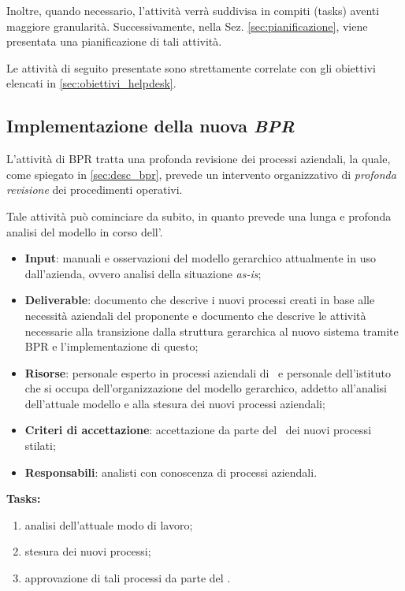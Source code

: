 	Inoltre, quando necessario, l'attività verrà suddivisa in compiti (tasks) aventi maggiore granularità.
	Successivamente, nella Sez. \ref{sec:pianificazione}, viene presentata una pianificazione di tali attività.
	
	Le attività di seguito presentate sono strettamente correlate con gli obiettivi elencati in \ref{sec:obiettivi_helpdesk}.
	
	\subsection{Implementazione della nuova \textit{BPR}}\label{subsec:bpr_implmentation}

		L'attività di BPR tratta una profonda revisione dei processi aziendali, la quale, come spiegato in \ref{sec:desc_bpr}, prevede un intervento organizzativo di \textit{profonda revisione} dei procedimenti operativi.
		
		Tale attività può cominciare da subito, in quanto prevede una lunga e profonda analisi del modello in corso dell'\istituto.
		
		\begin{itemize}[noitemsep]
			\renewcommand\labelitemi{--}
			\item \textbf{Input}: manuali e osservazioni del modello gerarchico attualmente in uso dall'azienda, ovvero analisi della situazione \textit{as-is};
			\item \textbf{Deliverable}: documento che descrive i nuovi processi creati in base alle necessità aziendali del proponente e documento che descrive le attività necessarie alla transizione dalla struttura gerarchica al nuovo sistema tramite BPR e l'implementazione di questo;
			\item \textbf{Risorse}: personale esperto in processi aziendali di \azienda~e personale dell'istituto che si occupa dell'organizzazione del modello gerarchico, addetto all'analisi dell'attuale modello e alla stesura dei nuovi processi aziendali;
			\item \textbf{Criteri di accettazione}: accettazione da parte del \proponente~dei nuovi processi stilati;
			\item \textbf{Responsabili}: analisti con conoscenza di processi aziendali.
		\end{itemize}
	
		\textbf{Tasks:}
		\begin{enumerate}[noitemsep]
			\item analisi dell'attuale modo di lavoro;
			\item stesura dei nuovi processi;
			\item approvazione di tali processi da parte del \proponente.
		\end{enumerate}
	
